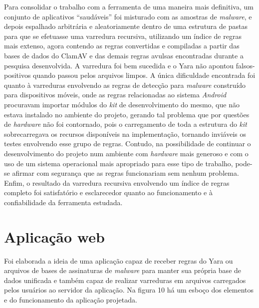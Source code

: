 Para consolidar o trabalho com a ferramenta de uma maneira mais definitiva, um
conjunto de aplicativos ``saudáveis'' foi misturado com as amostras de
\textit{malware}, e depois espalhado arbitrária e aleatoriamente dentro de uma
estrutura de pastas para que se efetuasse uma varredura recursiva, utilizando um
índice de regras mais extenso, agora contendo as regras convertidas e compiladas
a partir das bases de dados do ClamAV e das demais regras avulsas encontradas
durante a pesquisa desenvolvida. A varredura foi bem sucedida e o Yara não
apontou falsos-positivos quando passou pelos arquivos limpos. A única
dificuldade encontrada foi quanto à varreduras envolvendo as regras de detecção
para \textit{malware} construído para dispositivos móveis, onde as regras
relacionadas ao sistema \textit{Android} procuravam importar módulos do
\textit{kit} de desenvolvimento do mesmo, que não estava instalado no ambiente
do projeto, gerando tal problema que por questões de \textit{hardware} não foi
contornado, pois o carregamento de toda a estrutura do \textit{kit}
sobrecarregava os recursos disponíveis na implementação,  tornando inviáveis os
testes envolvendo esse grupo de regras. Contudo, na possibilidade de continuar o
desenvolvimento do projeto num ambiente com \textit{hardware} mais generoso e
com o uso de um sistema operacional mais apropriado para esse tipo de trabalho,
pode-se afirmar com segurança que as regras funcionariam sem nenhum problema.
Enfim, o resultado da varredura recursiva envolvendo um índice de regras
completo foi satisfatório e  esclarecedor quanto ao funcionamento e à
confiabilidade da ferramenta estudada.

\section{Aplicação web}
\label{s.prototipo}

Foi elaborada a ideia de uma aplicação capaz de receber regras do Yara ou
arquivos de bases de assinaturas de \textit{malware} para manter sua própria
base de dados unificada e também capaz de realizar varreduras em arquivos
carregados pelos usuários ao servidor da aplicação. Na figura 10 há um
esboço dos elementos e do funcionamento da aplicação projetada.

